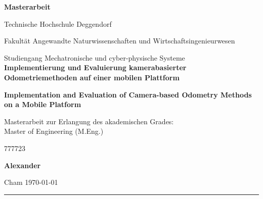 \begin{titlepage}
  
    \centering

      \Large
      \vspace{5cm}
      
      \textbf{Masterarbeit}
    
		\linespread{2}   
		   
      	\normalsize Technische Hochschule Deggendorf\\ 
      	\linespread{2}
      	
      	\normalsize Fakultät Angewandte Naturwissenschaften und Wirtschaftsingenieurwesen\\
      	\linespread{2}
      	
      	\normalsize Studiengang Mechatronische und cyber-physische Systeme\\
      	
	      
	  	\Large
	  	\vspace{0.5cm}
	  \textbf{Implementierung und Evaluierung kamerabasierter Odometriemethoden auf einer mobilen Plattform}
	  \vspace{0.5cm}
	  
	  \textbf{Implementation and Evaluation of Camera-based Odometry Methods on a Mobile Platform}
	  \vspace{1cm}
  
      \normalsize Masterarbeit zur Erlangung des akademischen Grades:\\
      \normalsize Master of Engineering (M.Eng.)
      
      \vspace{1.0cm}
        {777723}{}

      \textbf{Alexander}

      \vspace{\fill}
      
      \normalsize Cham \today
      
      \rule{\textwidth}{.5pt}
      
\end{titlepage}
